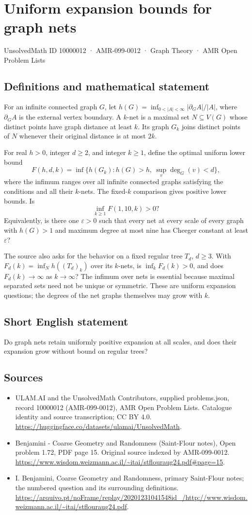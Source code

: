 \documentclass[11pt,a4paper]{article}
\begin{document}
\section*{Uniform expansion bounds for graph nets}\label{10000012}
{\small UnsolvedMath ID 10000012 · AMR-099-0012 · Graph Theory · AMR Open Problem Lists}
\subsection{Definitions and mathematical statement}
For an infinite connected graph $G$, let $h(G)=\inf_{0<|A|<\infty}|\partial_G A|/|A|$, where $\partial_G A$ is the external vertex boundary. A $k$-net is a maximal set $N\subseteq V(G)$ whose distinct points have graph distance at least $k$. Its graph $G_k$ joins distinct points of $N$ whenever their original distance is at most $2k$.

For real $h>0$, integer $d\ge2$, and integer $k\ge1$, define the optimal uniform lower bound
\[
F(h,d,k)=\inf\{h(G_k):h(G)>h,\ \sup_v\deg_G(v)<d\},
\]
where the infimum ranges over all infinite connected graphs satisfying the conditions and all their $k$-nets. The fixed-$k$ comparison gives positive lower bounds. Is
\[
\inf_{k\ge1}F(1,10,k)>0?
\]
Equivalently, is there one $\varepsilon>0$ such that every net at every scale of every graph with $h(G)>1$ and maximum degree at most nine has Cheeger constant at least $\varepsilon$?

The source also asks for the behavior on a fixed regular tree $T_d$, $d\ge3$. With $F_d(k)=\inf_N h((T_d)_k)$ over its $k$-nets, is $\inf_kF_d(k)>0$, and does $F_d(k)\to\infty$ as $k\to\infty$? The infimum over nets is essential because maximal separated sets need not be unique or symmetric. These are uniform expansion questions; the degrees of the net graphs themselves may grow with $k$.
\subsection{Short English statement}
Do graph nets retain uniformly positive expansion at all scales, and does their expansion grow without bound on regular trees?
\subsection{Sources}
\begin{itemize}
\item[S1] ULAM.AI and the UnsolvedMath Contributors, supplied problems.json, record 10000012 (AMR-099-0012), AMR Open Problem Lists. Catalogue identity and source transcription; CC BY 4.0.
\url{https://huggingface.co/datasets/ulamai/UnsolvedMath}.
\item[S2] Benjamini - Coarse Geometry and Randomness (Saint-Flour notes), Open problem 1.72, PDF page 15. Original source indexed by AMR-099-0012.
\url{https://www.wisdom.weizmann.ac.il/~itai/stflouraug24.pdf#page=15}.
\item[S3] I. Benjamini, Coarse Geometry and Randomness, primary Saint-Flour notes; the numbered question and its surrounding definitions.
\url{https://arquivo.pt/noFrame/replay/20201231041548id_/http://www.wisdom.weizmann.ac.il/~itai/stflouraug24.pdf}.
\end{itemize}
\end{document}
